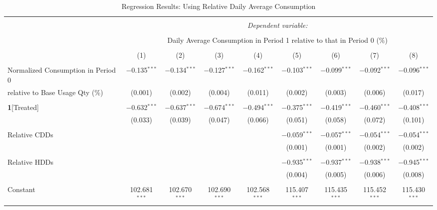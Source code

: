 \begin{table}[!htbp]
\centering 
\caption{Regression Results: Using Relative Daily Average Consumption} 
\label{Table:Regression-Results_Relative-Daily-Average} 
\small

\begin{adjustbox}{scale = 0.9}

\begin{tabular}{@{\extracolsep{5pt}}lcccccccc} 
\\[-1.8ex]\hline 
\hline \\[-1.8ex] 
 & \multicolumn{8}{c}{\textit{Dependent variable:}} \\ 
\cline{2-9} 
\\[-1.8ex] & \multicolumn{8}{c}{Daily Average Consumption in Period 1 relative to that in Period 0 (\%)} \\ 
\\[-1.8ex] & (1) & (2) & (3) & (4) & (5) & (6) & (7) & (8)\\ 
\hline \\[-1.8ex] 
 Normalized Consumption in Period 0 & $-$0.135$^{***}$ & $-$0.134$^{***}$ & $-$0.127$^{***}$ & $-$0.162$^{***}$ & $-$0.103$^{***}$ & $-$0.099$^{***}$ & $-$0.092$^{***}$ & $-$0.096$^{***}$ \\ 
relative to Base Usage Qty (\%) & (0.001) & (0.002) & (0.004) & (0.011) & (0.002) & (0.003) & (0.006) & (0.017) \\ 
  & & & & & & & & \\ 
 \textbf{1}[Treated] & $-$0.632$^{***}$ & $-$0.637$^{***}$ & $-$0.674$^{***}$ & $-$0.494$^{***}$ & $-$0.375$^{***}$ & $-$0.419$^{***}$ & $-$0.460$^{***}$ & $-$0.408$^{***}$ \\ 
  & (0.033) & (0.039) & (0.047) & (0.066) & (0.051) & (0.058) & (0.072) & (0.101) \\ 
  & & & & & & & & \\ 
 Relative CDDs &  &  &  &  & $-$0.059$^{***}$ & $-$0.057$^{***}$ & $-$0.054$^{***}$ & $-$0.054$^{***}$ \\ 
  &  &  &  &  & (0.001) & (0.001) & (0.002) & (0.002) \\ 
  & & & & & & & & \\ 
 Relative HDDs &  &  &  &  & $-$0.935$^{***}$ & $-$0.937$^{***}$ & $-$0.938$^{***}$ & $-$0.945$^{***}$ \\ 
  &  &  &  &  & (0.004) & (0.005) & (0.006) & (0.008) \\ 
  & & & & & & & & \\ 
 Constant & 102.681$^{***}$ & 102.670$^{***}$ & 102.690$^{***}$ & 102.568$^{***}$ & 115.407$^{***}$ & 115.435$^{***}$ & 115.452$^{***}$ & 115.430$^{***}$ \\ 

\end{tabular}
\end{adjustbox}
\end{table}
